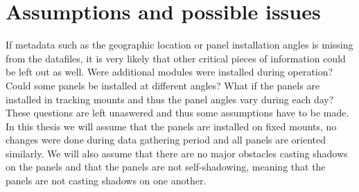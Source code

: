 







\section{Assumptions and possible issues}
If metadata such as the geographic location or panel installation angles is missing from the datafiles, it is very likely that other critical pieces of information could be left out as well. Were additional modules were installed during operation? Could some panels be installed at different angles? What if the panels are installed in tracking mounts and thus the panel angles vary during each day? These questions are left unaswered and thus some assumptions have to be made. In this thesis we will assume that the panels are installed on fixed mounts, no changes were done during data gathering period and all panels are oriented similarly. We will also assume that there are no major obstacles casting shadows on the panels and that the panels are not self-shadowing, meaning that the panels are not casting shadows on one another.

